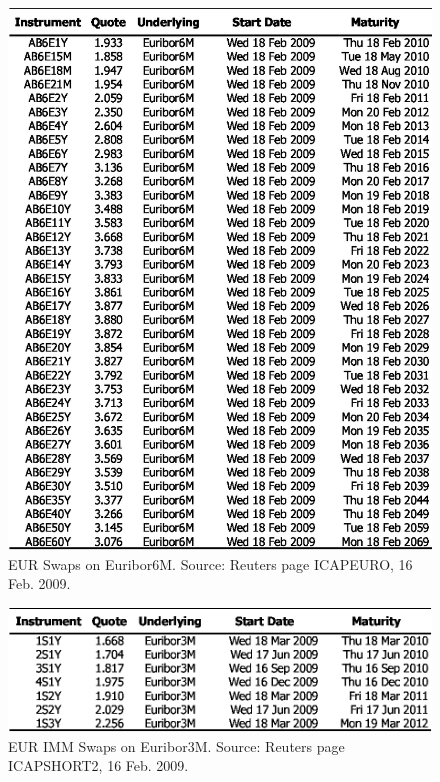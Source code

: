 \documentclass[11pt,reqno]{amsart}
\begin{document}
\begin{figure}[tbp]
\centering
\includegraphics[scale=0.9]{../figures/FigMktSwaps6M}
\caption{EUR Swaps on Euribor6M. Source: Reuters page ICAPEURO, 16 Feb. 2009.}
\label{fig:Swaps6M}
\end{figure}

\begin{figure}[tbp]
\centering
\includegraphics[scale=0.9]{../figures/FigMktSwapsIMM}
\caption{EUR IMM Swaps on Euribor3M. Source: Reuters page ICAPSHORT2, 16 Feb. 2009.}
\label{fig:SwapsIMM}
\end{figure}
\end{document}
